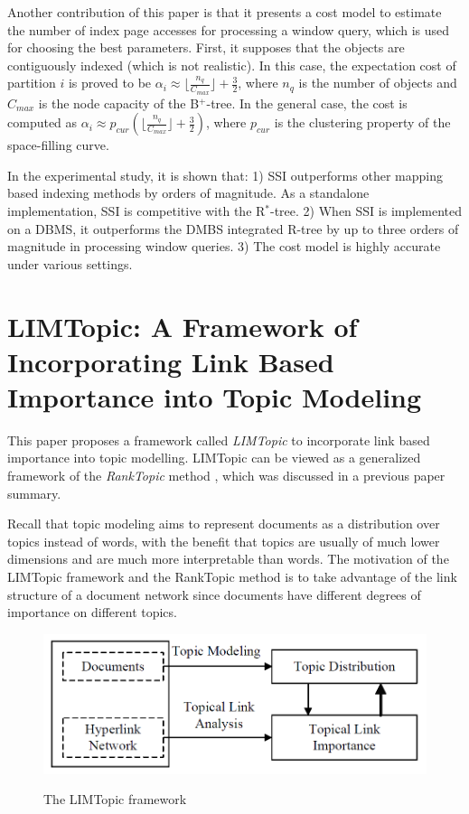 \documentclass[paper=a4, fontsize=18pt]{article} %
\numberwithin{equation}{section} %
\numberwithin{figure}{section} %
\numberwithin{table}{section} %
\begin{document}
Another contribution of this paper is that it presents a cost model to estimate the number of index page accesses for processing a window query, which is used for choosing the best parameters. First, it supposes that the objects are contiguously indexed (which is not realistic). In this case, the expectation cost of partition $i$ is proved to be $\alpha_i \approx \lfloor \frac{n_q}{C_{max}}\rfloor + \frac{3}{2}$, where $n_q$ is the number of objects and $C_{max}$ is the node capacity of the B$^+$-tree. In the general case, the cost is computed as $\alpha_i \approx p_{cur}(\lfloor\frac{n_q}{C_{max}}\rfloor + \frac{3}{2})$, where $p_{cur}$ is the clustering property of the space-filling curve.

In the experimental study, it is shown that: 1) SSI outperforms other mapping based indexing methods by orders of magnitude. As a standalone implementation, SSI is competitive with the R$^*$-tree. 2) When SSI is implemented on a DBMS, it outperforms the DMBS integrated R-tree by up to three orders of magnitude in processing window queries. 3) The cost model is highly accurate under various settings.

\section{LIMTopic: {A} Framework of Incorporating Link Based Importance into Topic Modeling \cite{DLLZGW14}}

This paper proposes a framework called \emph{LIMTopic} to incorporate link based importance into topic modelling. LIMTopic can be viewed as a generalized framework of the \emph{RankTopic} method \cite{DLLZW12}, which was discussed in a previous paper summary.

Recall that topic modeling aims to represent documents as a distribution over topics instead of words, with the benefit that topics are usually of much lower dimensions and are much more interpretable than words. The motivation of the LIMTopic framework and the RankTopic method is to take advantage of the link structure of a document network since documents have different degrees of importance on different topics.

\begin{figure}[h]
  \centering
  \includegraphics[width=.6\linewidth]{9_5_LIMTopic.png}\\
  \caption{The LIMTopic framework}\label{fig:Topic}
\end{figure}
\end{document}
